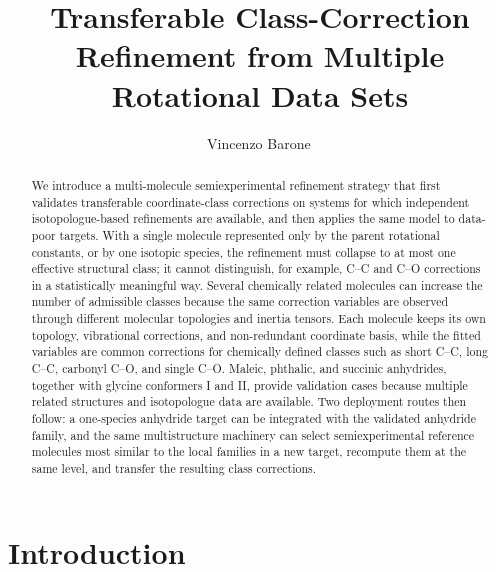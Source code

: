 \documentclass[journal=jpclcd,manuscript=letter]{achemso}
\author{Vincenzo Barone\,\orcidlink{0000-0001-6420-4107}}
\affiliation{Consorzio Interuniversitario Nazionale per la Scienza e Tecnologia dei Materiali (INSTM), via G. Giusti 9, 50121 Firenze, Italy}
\title{Transferable Class-Correction Refinement from Multiple Rotational Data Sets}
\begin{document}
\raggedbottom

\begin{tocentry}
\centering
\resizebox{0.94\linewidth}{!}{}
\end{tocentry}

\begin{abstract}
We introduce a multi-molecule semiexperimental refinement strategy that first validates transferable coordinate-class corrections on systems for which independent isotopologue-based refinements are available, and then applies the same model to data-poor targets.  With a single molecule represented only by the parent rotational constants, or by one isotopic species, the refinement must collapse to at most one effective structural class; it cannot distinguish, for example, C--C and C--O corrections in a statistically meaningful way.  Several chemically related molecules can increase the number of admissible classes because the same correction variables are observed through different molecular topologies and inertia tensors.  Each molecule keeps its own topology, vibrational corrections, and non-redundant coordinate basis, while the fitted variables are common corrections for chemically defined classes such as short C--C, long C--C, carbonyl C--O, and single C--O.  Maleic, phthalic, and succinic anhydrides, together with glycine conformers I and II, provide validation cases because multiple related structures and isotopologue data are available.  Two deployment routes then follow: a one-species anhydride target can be integrated with the validated anhydride family, and the same multistructure machinery can select semiexperimental reference molecules most similar to the local families in a new target, recompute them at the same level, and transfer the resulting class corrections.
\end{abstract}

\section*{Introduction}
\end{document}
